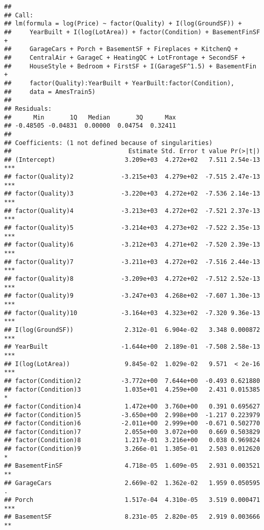 \documentclass[
]{article}
\begin{document}
\begin{verbatim}
## 
## Call:
## lm(formula = log(Price) ~ factor(Quality) + I(log(GroundSF)) + 
##     YearBuilt + I(log(LotArea)) + factor(Condition) + BasementFinSF + 
##     GarageCars + Porch + BasementSF + Fireplaces + KitchenQ + 
##     CentralAir + GarageC + HeatingQC + LotFrontage + SecondSF + 
##     HouseStyle + Bedroom + FirstSF + I(GarageSF^1.5) + BasementFin + 
##     factor(Quality):YearBuilt + YearBuilt:factor(Condition), 
##     data = AmesTrain5)
## 
## Residuals:
##      Min       1Q   Median       3Q      Max 
## -0.48505 -0.04831  0.00000  0.04754  0.32411 
## 
## Coefficients: (1 not defined because of singularities)
##                                Estimate Std. Error t value Pr(>|t|)    
## (Intercept)                   3.209e+03  4.272e+02   7.511 2.54e-13 ***
## factor(Quality)2             -3.215e+03  4.279e+02  -7.515 2.47e-13 ***
## factor(Quality)3             -3.220e+03  4.272e+02  -7.536 2.14e-13 ***
## factor(Quality)4             -3.213e+03  4.272e+02  -7.521 2.37e-13 ***
## factor(Quality)5             -3.214e+03  4.273e+02  -7.522 2.35e-13 ***
## factor(Quality)6             -3.212e+03  4.271e+02  -7.520 2.39e-13 ***
## factor(Quality)7             -3.211e+03  4.272e+02  -7.516 2.44e-13 ***
## factor(Quality)8             -3.209e+03  4.272e+02  -7.512 2.52e-13 ***
## factor(Quality)9             -3.247e+03  4.268e+02  -7.607 1.30e-13 ***
## factor(Quality)10            -3.164e+03  4.323e+02  -7.320 9.36e-13 ***
## I(log(GroundSF))              2.312e-01  6.904e-02   3.348 0.000872 ***
## YearBuilt                    -1.644e+00  2.189e-01  -7.508 2.58e-13 ***
## I(log(LotArea))               9.845e-02  1.029e-02   9.571  < 2e-16 ***
## factor(Condition)2           -3.772e+00  7.644e+00  -0.493 0.621880    
## factor(Condition)3            1.035e+01  4.259e+00   2.431 0.015385 *  
## factor(Condition)4            1.472e+00  3.760e+00   0.391 0.695627    
## factor(Condition)5           -3.650e+00  2.998e+00  -1.217 0.223979    
## factor(Condition)6           -2.011e+00  2.999e+00  -0.671 0.502770    
## factor(Condition)7            2.055e+00  3.072e+00   0.669 0.503829    
## factor(Condition)8            1.217e-01  3.216e+00   0.038 0.969824    
## factor(Condition)9            3.266e-01  1.305e-01   2.503 0.012620 *  
## BasementFinSF                 4.718e-05  1.609e-05   2.931 0.003521 ** 
## GarageCars                    2.669e-02  1.362e-02   1.959 0.050595 .  
## Porch                         1.517e-04  4.310e-05   3.519 0.000471 ***
## BasementSF                    8.231e-05  2.820e-05   2.919 0.003666 ** 

\end{verbatim}
\end{document}
